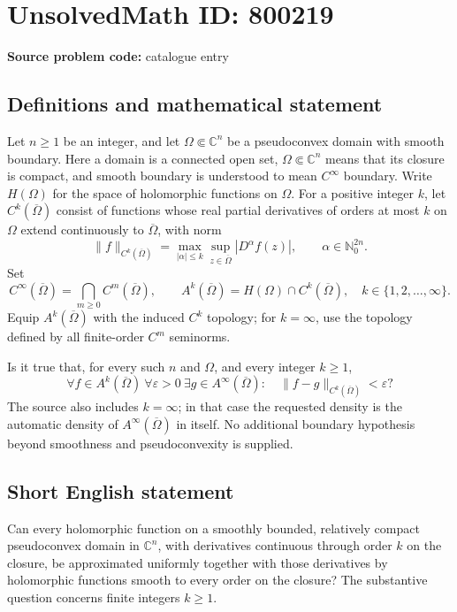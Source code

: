 \documentclass[11pt]{article}
\newcommand{\N}{\mathbb{N}}
\newcommand{\C}{\mathbb{C}}
\begin{document}
\section*{UnsolvedMath ID: 800219}
\textbf{Source problem code:} catalogue entry
\subsection{Definitions and mathematical statement}
Let \(n\geq 1\) be an integer, and let \(\Omega\Subset\C^n\) be a pseudoconvex domain with smooth boundary. Here a domain is a connected open set, \(\Omega\Subset\C^n\) means that its closure is compact, and smooth boundary is understood to mean \(C^\infty\) boundary. Write \(H(\Omega)\) for the space of holomorphic functions on \(\Omega\). For a positive integer \(k\), let \(C^k(\overline\Omega)\) consist of functions whose real partial derivatives of orders at most \(k\) on \(\Omega\) extend continuously to \(\overline\Omega\), with norm
\[
\|f\|_{C^k(\overline\Omega)}=\max_{|\alpha|\leq k}\sup_{z\in\overline\Omega}|D^\alpha f(z)|,
\qquad \alpha\in\N_0^{2n}.
\]
Set
\[
C^\infty(\overline\Omega)=\bigcap_{m\geq 0}C^m(\overline\Omega),
\qquad A^k(\overline\Omega)=H(\Omega)\cap C^k(\overline\Omega),
\quad k\in\{1,2,\ldots,\infty\}.
\]
Equip \(A^k(\overline\Omega)\) with the induced \(C^k\) topology; for \(k=\infty\), use the topology defined by all finite-order \(C^m\) seminorms.

Is it true that, for every such \(n\) and \(\Omega\), and every integer \(k\geq 1\),
\[
\forall f\in A^k(\overline\Omega)\ \forall\varepsilon>0\ \exists g\in A^\infty(\overline\Omega):\quad
\|f-g\|_{C^k(\overline\Omega)}<\varepsilon?
\]
The source also includes \(k=\infty\); in that case the requested density is the automatic density of \(A^\infty(\overline\Omega)\) in itself. No additional boundary hypothesis beyond smoothness and pseudoconvexity is supplied.
\subsection{Short English statement}
Can every holomorphic function on a smoothly bounded, relatively compact pseudoconvex domain in \(\C^n\), with derivatives continuous through order \(k\) on the closure, be approximated uniformly together with those derivatives by holomorphic functions smooth to every order on the closure? The substantive question concerns finite integers \(k\geq 1\).
\end{document}
